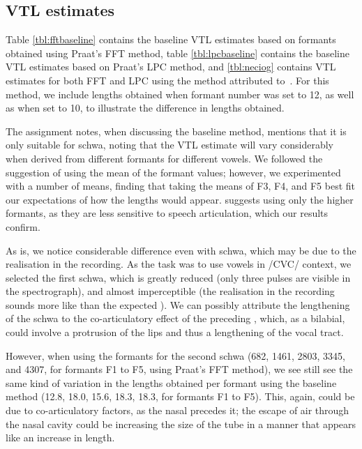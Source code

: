 \documentclass[11pt]{article}
\begin{document}
\subsection{VTL estimates}
\label{sect:vtlest}

Table \ref{tbl:fftbaseline} contains the baseline VTL estimates based on formants obtained using Praat's FFT method, table \ref{tbl:lpcbaseline} contains the baseline VTL estimates based on Praat's LPC method, and \ref{tbl:neciog} contains VTL estimates for both FFT and LPC using the method attributed to~\citet{necioglu2000unsupervised}. For this method, we include lengths obtained when formant number was set to 12, as well as when set to 10, to illustrate the difference in lengths obtained.

The assignment notes, when discussing the baseline method, mentions that it is only suitable for schwa, noting that the VTL estimate will vary considerably when derived from different formants for different vowels. We followed the suggestion of using the mean of the formant values; however, we experimented with a number of means, finding that taking the means of F3, F4, and F5 best fit our expectations of how the lengths would appear. \citet{wakita1977normalization} suggests using only the higher formants, as they are less sensitive to speech articulation, which our results confirm.

As is, we notice considerable difference even with schwa, which may be due to the realisation in the recording. As the task was to use vowels in /CVC/ context, we selected the first schwa, which is greatly reduced (only three pulses are visible in the spectrograph), and almost imperceptible (the realisation in the recording sounds more like \textipa{[b'\s{n}A:.n@]} than the expected ). We can possibly attribute the lengthening of the schwa to the co-articulatory effect of the preceding , which, as a bilabial, could involve a protrusion of the lips and thus a lengthening of the vocal tract.

However, when using the formants for the second schwa (682, 1461, 2803, 3345, and 4307, for formants F1 to F5, using Praat's FFT method), we see still see the same kind of variation in the lengths obtained per formant using the baseline method (12.8, 18.0, 15.6, 18.3, 18.3, for formants F1 to F5). This, again, could be due to co-articulatory factors, as the nasal  precedes it; the escape of air through the nasal cavity could be increasing the size of the tube in a manner that appears like an increase in length.
\end{document}
